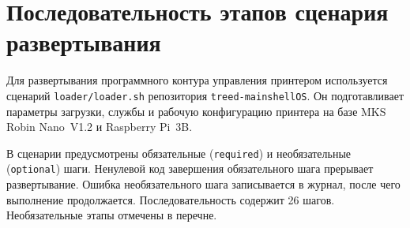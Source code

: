 \chapter{Последовательность этапов сценария развертывания}\label{app:loader_steps}

Для развертывания программного контура управления принтером используется сценарий \texttt{loader/loader.sh} репозитория \texttt{treed-mainshellOS}. Он подготавливает параметры загрузки, службы и рабочую конфигурацию принтера на базе MKS Robin Nano~V1.2 и Raspberry Pi~3B.

В сценарии предусмотрены обязательные (\texttt{required}) и необязательные (\texttt{optional}) шаги. Ненулевой код завершения обязательного шага прерывает развертывание. Ошибка необязательного шага записывается в журнал, после чего выполнение продолжается. Последовательность содержит 26 шагов. Необязательные этапы отмечены в перечне.


